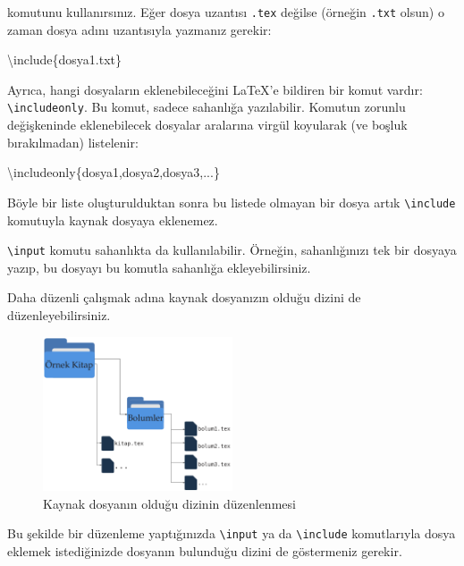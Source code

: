 \documentclass[
  10pt,
]{scrbook}
\newenvironment{Shaded}{\begin{snugshade}}{\end{snugshade}}
\newcommand{\BuiltInTok}[1]{#1}
\newcommand{\ExtensionTok}[1]{#1}
\newcommand{\FunctionTok}[1]{\textcolor[rgb]{0.00,0.00,0.00}{#1}}
\newcommand{\NormalTok}[1]{#1}
\theoremstyle{definition}
\theoremstyle{definition}
\theoremstyle{definition}
\theoremstyle{definition}
\theoremstyle{remark}
\begin{document}
komutunu kullanırsınız. Eğer dosya uzantısı \texttt{.tex} değilse (örneğin \texttt{.txt} olsun) o zaman dosya adını uzantısıyla yazmanız gerekir:

\begin{Shaded}
\begin{Highlighting}[]
\BuiltInTok{\textbackslash{}include}\NormalTok{\{}\ExtensionTok{dosya1.txt}\NormalTok{\}}
\end{Highlighting}
\end{Shaded}

Ayrıca, hangi dosyaların eklenebileceğini LaTeX'e bildiren bir komut vardır: \texttt{\textbackslash{}includeonly}. Bu komut, sadece sahanlığa yazılabilir. Komutun zorunlu değişkeninde eklenebilecek dosyalar aralarına virgül koyularak (ve boşluk bırakılmadan) listelenir:

\begin{Shaded}
\begin{Highlighting}[]
\FunctionTok{\textbackslash{}includeonly}\NormalTok{\{dosya1,dosya2,dosya3,...\}}
\end{Highlighting}
\end{Shaded}

Böyle bir liste oluşturulduktan sonra bu listede olmayan bir dosya artık \texttt{\textbackslash{}include} komutuyla kaynak dosyaya eklenemez.

\texttt{\textbackslash{}input} komutu sahanlıkta da kullanılabilir. Örneğin, sahanlığınızı tek bir dosyaya yazıp, bu dosyayı bu komutla sahanlığa ekleyebilirsiniz.

Daha düzenli çalışmak adına kaynak dosyanızın olduğu dizini de düzenleyebilirsiniz.

\begin{figure}
\centering
\includegraphics[width=0.5\textwidth,height=\textheight]{images/dizin.png}
\caption{Kaynak dosyanın olduğu dizinin düzenlenmesi}
\end{figure}

Bu şekilde bir düzenleme yaptığınızda \texttt{\textbackslash{}input} ya da \texttt{\textbackslash{}include} komutlarıyla dosya eklemek istediğinizde dosyanın bulunduğu dizini de göstermeniz gerekir.
\end{document}
